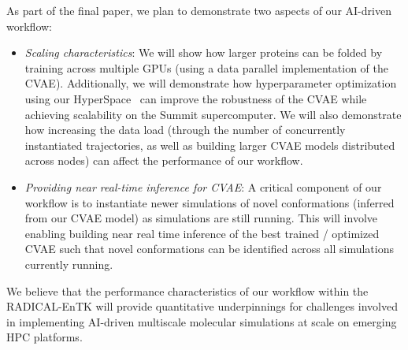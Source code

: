 As part of the final paper, we plan to demonstrate two aspects of our AI-driven workflow: 
\begin{itemize}
\item \emph{Scaling characteristics}: We will show how larger proteins can be folded by  training across multiple GPUs (using a data parallel implementation of the CVAE). Additionally, we will demonstrate how hyperparameter optimization using our HyperSpace~\cite{Young_2018} can improve the robustness of the CVAE while achieving scalability on the Summit supercomputer. We will also demonstrate how increasing the data load (through the number of concurrently instantiated trajectories, as well as building larger CVAE models distributed across nodes) can affect the performance of our workflow. 
\item \emph{Providing near real-time inference for CVAE}: A critical component of our workflow is to instantiate newer simulations of novel conformations (inferred from our CVAE model) as simulations are still running. This will involve enabling building near real time inference of the best trained / optimized CVAE such that novel conformations can be identified across all simulations currently running. 
\end{itemize}
We believe that the performance characteristics of our workflow within the RADICAL-EnTK will provide quantitative underpinnings for challenges involved in implementing AI-driven multiscale molecular simulations at scale on emerging HPC platforms. 